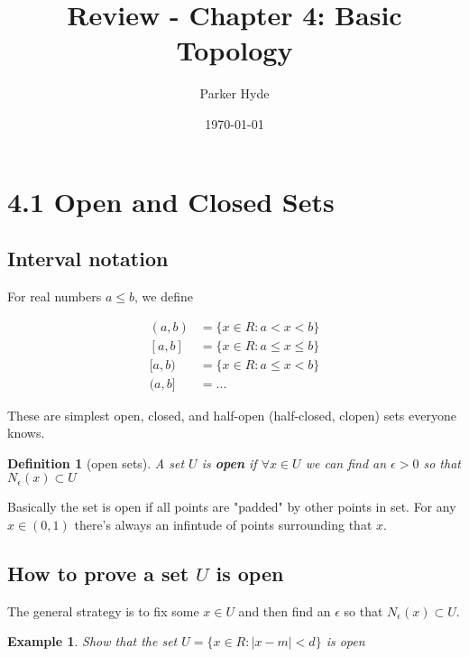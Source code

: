 \documentclass{article}
\begin{document}
\title{Review - Chapter 4: Basic Topology}
\author{Parker Hyde}
\date{\today}
\maketitle

\newtheorem{theorem}{Theorem}

\section*{4.1 Open and Closed Sets}

\subsection*{Interval notation}
For real numbers \( a \le b \), we define

 \begin{align*}
     (a,b) &= \{x \in R : a < x < b\}\\
     [a,b] &= \{x \in R : a \le x \le b\} \\
     [a,b) &= \{x \in R : a \le x < b\} \\
     (a,b] &= {...}
\end{align*}

These are simplest open, closed, and half-open (half-closed, clopen) sets
everyone knows.

\newtheorem{definition}{Definition}
\begin{definition}[open sets]
    A set \( U \) is \textbf{open} if \( \forall x \in U \) we 
    can find an \( \epsilon > 0 \) so that  \( N_\epsilon(x) \subset U \) 
\end{definition}

Basically the set is open if all points are "padded" by other points in set. 
For any \( x \in (0, 1) \) there's always an infintude of points surrounding that  \( x \).

\subsection*{How to prove a set \( U \) is open}

The general strategy is to fix some \( x \in U \) and then find an \( \epsilon \) 
so that  \( N_\epsilon(x) \subset U\).

\newtheorem{exmp}{Example}
\begin{exmp}
    Show that the set \( U = \{x \in R : |x - m| < d \}\) is open
\end{exmp}
\end{document}
